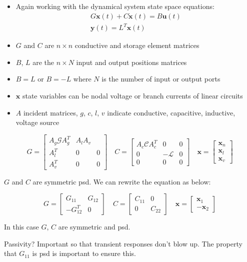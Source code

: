 \documentclass[
]{article}
\begin{document}
\begin{itemize}
  \item Again working with the dynamical system state space equations:
\[\begin{array}{l}{G \mathbf{x}(t)+C \dot{\mathbf{x}}(t)=B \mathbf{u}(t)} \\ {\mathbf{y}(t)} {=L^{T} \mathbf{x}(t)}\end{array}\]
  \item $G$ and $C$ are $n\times n$ conductive and storage element matrices
  \item $B$, $L$ are the $n \times N $ input and output positions matrices
  \item $B=L$ or $B = -L$ where $N$ is the number of input or output ports
  \item $\mathbf x$ state variables can be nodal voltage or branch currents of linear circuits
  \item $A$ incident matrices, $g$, $c$, $l$, $v$ indicate conductive, capacitive, inductive, voltage source
\end{itemize}


\[G=\left[\begin{array}{ccc}{A_{g} \mathcal{G} A_{g}^{T}} & {A_{l} A_{v}} \\ {A_{l}^{T}} & {0} & {0} \\ {A_{v}^{T}} & {0} & {0}\end{array}\right] \quad C=\left[\begin{array}{ccc}{A_{c} \mathcal{C} A_{c}^{T}} & {0} & {0} \\ {0} & {-\mathcal{L}} & {0} \\ {0} & {0} & {0}\end{array}\right] \quad \mathbf{x}=\left[\begin{array}{c}{\mathbf{x}_{n}} \\ {\mathbf{x}_{l}} \\ {\mathbf{x}_{v}}\end{array}\right]\]

$G$ and $C$ are symmetric psd. We can rewrite the equation as below:

\[G=\left[\begin{array}{ll}{G_{11}} & {G_{12}} \\ {-G_{12}^{T}} & {0}\end{array}\right] \quad C=\left[\begin{array}{cc}{C_{11}} & {0} \\ {0} & {C_{22}}\end{array}\right] \quad \mathbf{x}=\left[\begin{array}{c}{\mathbf{x}_{1}} \\ {-\mathbf{x}_{2}}\end{array}\right]\]

In this case $G$, $C$ are symmetric and psd. 


Passivity? Important so that transient responses don't blow up. The property that $G_{11} $ is psd is important to ensure this.
\end{document}
